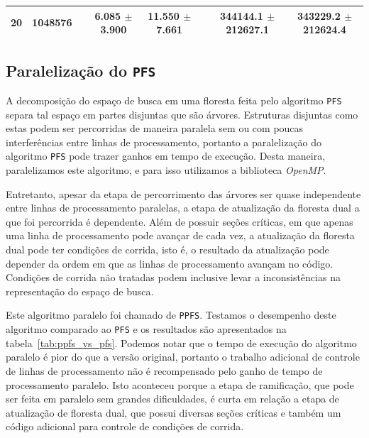 \documentclass[12pt]{article}
\newcommand{\toolname}[1]{\textit{#1}}
\newcommand{\algname}[1]{\texttt{#1}}
\begin{document}
\begin{table}
\begin{tabular}{cc c cc c cc}
20 & 1048576 &&  6.085 $\pm$ 3.900 & 11.550 $\pm$ 7.661 &&  344144.1 $\pm$ 212627.1 & 343229.2 $\pm$ 212624.4 \\
\bottomrule 
\end{tabular}%
\end{table}


\subsection{Paralelização do \algname{PFS}}
A decomposição do espaço de busca em uma floresta feita pelo algoritmo
\algname{PFS} separa tal espaço em partes disjuntas que são árvores.
Estruturas disjuntas como estas podem ser percorridas de maneira 
paralela sem ou com poucas interferências entre linhas de processamento,
portanto a paralelização do algoritmo \algname{PFS} pode trazer ganhos 
em tempo de execução. Desta maneira, paralelizamos este algoritmo, e 
para isso utilizamos a biblioteca \toolname{OpenMP}.

Entretanto, apesar da etapa de percorrimento das árvores ser quase 
independente entre linhas de processamento paralelas, a etapa de 
atualização da floresta dual a que foi percorrida é dependente. Além
de possuir seções críticas, em que apenas uma linha de processamento 
pode avançar de cada vez, a atualização da floresta dual pode ter
condições de corrida, isto é, o resultado da atualização pode depender
da ordem em que as linhas de processamento avançam no código. Condições
de corrida não tratadas podem inclusive levar a inconsistências na
representação do espaço de busca.

Este algoritmo paralelo foi chamado de \algname{PPFS}. Testamos o 
desempenho deste algoritmo comparado ao \algname{PFS} e os resultados
são apresentados na tabela~\ref{tab:ppfs_vs_pfs}. Podemos notar que o
tempo de execução do algoritmo paralelo é pior do que a versão original,
portanto o trabalho adicional de controle de linhas de processamento
não é recompensado pelo ganho de tempo de processamento paralelo. Isto
aconteceu porque a etapa de ramificação, que pode ser feita em paralelo
sem grandes dificuldades, é curta em relação a etapa de atualização de
floresta dual, que possui diversas seções críticas e também um código
adicional para controle de condições de corrida.
\end{document}
